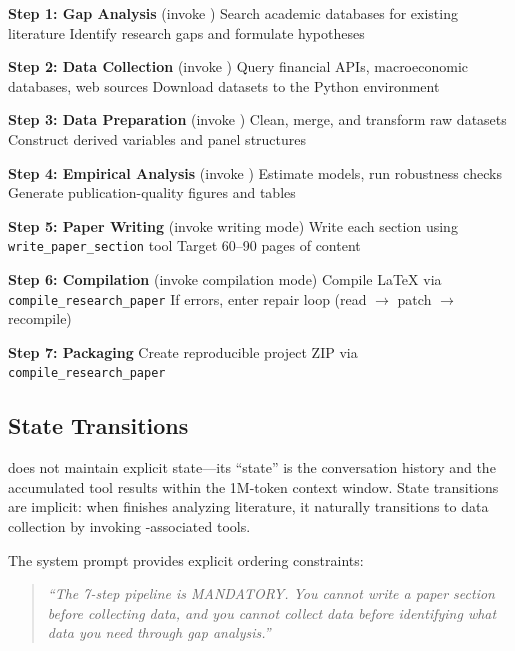 \begin{algorithm}[H]
\caption{Euler's Research Pipeline Orchestration}
\label{alg:euler-pipeline}
\SetAlgoLined
{}

\textbf{Step 1: Gap Analysis} (invoke \gauss)\;
Search academic databases for existing literature\;
Identify research gaps and formulate hypotheses\;

\textbf{Step 2: Data Collection} (invoke \turing)\;
Query financial APIs, macroeconomic databases, web sources\;
Download datasets to the Python environment\;

\textbf{Step 3: Data Preparation} (invoke \newton)\;
Clean, merge, and transform raw datasets\;
Construct derived variables and panel structures\;

\textbf{Step 4: Empirical Analysis} (invoke \fisher)\;
Estimate models, run robustness checks\;
Generate publication-quality figures and tables\;

\textbf{Step 5: Paper Writing} (invoke \euler writing mode)\;
Write each section using \texttt{write\_paper\_section} tool\;
Target 60--90 pages of content\;

\textbf{Step 6: Compilation} (invoke \euler compilation mode)\;
Compile \LaTeX{} via \texttt{compile\_research\_paper}\;
If errors, enter repair loop (read $\to$ patch $\to$ recompile)\;

\textbf{Step 7: Packaging}\;
Create reproducible project ZIP via \texttt{compile\_research\_paper}\;
\end{algorithm}

\subsection{State Transitions}

\euler does not maintain explicit state---its ``state'' is the conversation history and the accumulated tool results within the 1M-token context window.
State transitions are implicit: when \euler finishes analyzing literature, it naturally transitions to data collection by invoking \turing-associated tools.

The system prompt provides explicit ordering constraints:
\begin{quote}
\itshape
``The 7-step pipeline is MANDATORY. You cannot write a paper section before collecting data, and you cannot collect data before identifying what data you need through gap analysis.''
\end{quote}

